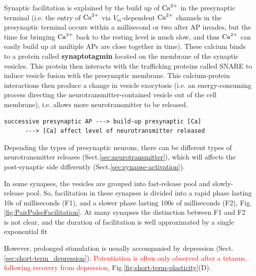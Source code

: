 
Synaptic facilitation is explained by the build up of ${\text{Ca}^{2+}}$ in the presynaptic
terminal (i.e. the entry of ${\text{Ca}^{2+}}$ via $V_m$-dependent ${\text{Ca}^{2+}}$ channels in the
presynaptic terminal occurs within a millisecond or two after AP invades, but
the time for bringing ${\text{Ca}^{2+}}$ back to the resting level is much slow, and thus
${\text{Ca}^{2+}}$ can easily build up at multiple APs are close together in time).
These calcium binds to a protein called {\bf synaptotagmin} located on the
membrane of the synaptic vesicles. This protein then interacts with the
trafficking proteins called SNARE to induce vesicle fusion with the presynaptic
membrane. This calcium-protein interactions then produce a change in vesicle
exocytosis (i.e. an energy-consuming process directing the
neurotransmitter-contained vesicle out of the cell membrane), i.e. allows more
neurotransmitter to be released.

\begin{verbatim}
successive presynaptic AP ---> build-up presynaptic [Ca]
      ---> [Ca] affect level of neurotransmitter released 
\end{verbatim}

Depending the types of presynaptic neurons, there can be different types of
neurotransmitter releases (Sect.\ref{sec:neurotransmitter}), which will affects
the post-synaptic side differently (Sect.\ref{sec:synapse-activation}).

In some synapses, the vesicles are grouped into fast-release pool
and slowly-release pool. So, facilitation in these synapses is divided into a
rapid phase lasting 10s of milliseconds (F1), and a slower phase lasting 100s of
milliseconds (F2), Fig.\ref{fig:PairPulseFacilitation}.
At many synapses the distinction between F1 and F2 is not clear, and the
duration of facilitation is well approximated by a single exponential fit
  
However, prolonged stimulation is usually accompanied by depression
(Sect.\ref{sec:short-term_depression}). \textcolor{red}{Potentiation is often
only observed after a tetanus, following recovery from depression}, 
Fig.\ref{fig:short-term-plasticity}(D).

